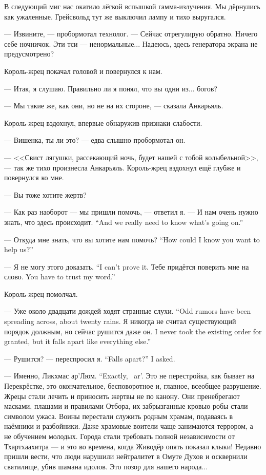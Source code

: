 В следующий миг нас окатило лёгкой вспышкой гамма-излучения.
Мы дёрнулись как ужаленные.
Грейсвольд тут же выключил лампу и тихо выругался.

--- Извините, --- пробормотал технолог.
--- Сейчас отрегулирую обратно.
Ничего себе ночничок.
Эти тси --- ненормальные...
Надеюсь, здесь генератора экрана не предусмотрено?

Король-жрец покачал головой и повернулся к нам.

--- Итак, я слушаю.
Правильно ли я понял, что вы одни из... богов?

--- Мы такие же, как они, но не на их стороне, --- сказала Анкарьяль.

Король-жрец вздохнул, впервые обнаружив признаки слабости.

--- Вишенка, ты ли это? --- едва слышно пробормотал он.

--- <<Свист лягушки, рассекающий ночь, будет нашей с тобой колыбельной>>\FM, --- так же тихо произнесла Анкарьяль.
Король-жрец вздохнул ещё глубже и повернулся ко мне.

--- Вы тоже хотите жертв?

--- Как раз наоборот --- мы пришли помочь, --- ответил я.
{--- И нам очень нужно знать, что здесь происходит.}
{``And we really need to know what's going on.''}

{--- Откуда мне знать, что вы хотите нам помочь?}
{``How could I know you want to help us?''}

{--- Я не могу этого доказать.}
{``I can't prove it.}
{Тебе придётся поверить мне на слово.}
{You have to trust my word.''}

Король-жрец помолчал.

{--- Уже около двадцати дождей ходят странные слухи.}
{``Odd rumors have been spreading across, about twenty rains.}
{Я никогда не считал существующий порядок должным, но сейчас рушится даже он.}
{I never took the existing order for granted, but it falls apart like everything else.''}

{--- Рушится? --- переспросил я.}
{``Falls apart?'' I asked.}

{--- Именно, Ликхмас ар'Люм.}
{``Exactly, \Likchmas\ ar'\Loem.}
Это не перестройка, как бывает на Перекрёстке, это окончательное, бесповоротное и, главное, всеобщее разрушение.
Жрецы стали лечить и приносить жертвы не по канону.
Они пренебрегают масками, плащами и правилами Отбора, их забрызганные кровью робы стали символом ужаса.
Воины перестали служить родным храмам, подаваясь в наёмники и разбойники.
Даже храмовые воители чаще занимаются террором, а не обучением молодых.
Города стали требовать полной независимости от Тхартхаахитра --- и это во времена, когда Живодёр опять показал клыки!
Недавно пришли вести, что люди нарушили нейтралитет в Омуте Духов и осквернили святилище, убив шамана идолов.
Это позор для нашего народа...

